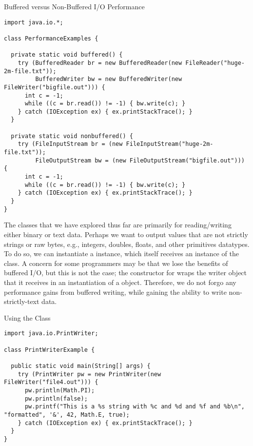 \begin{cl}[]{Buffered versus Non-Buffered I/O Performance}
\begin{lstlisting}[language=MyJava]
import java.io.*;

class PerformanceExamples {
  
  private static void buffered() {
    try (BufferedReader br = new BufferedReader(new FileReader("huge-2m-file.txt"));
         BufferedWriter bw = new BufferedWriter(new FileWriter("bigfile.out"))) {
      int c = -1;
      while ((c = br.read()) != -1) { bw.write(c); }
    } catch (IOException ex) { ex.printStackTrace(); }
  }
  
  private static void nonbuffered() {
    try (FileInputStream br = (new FileInputStream("huge-2m-file.txt"));
         FileOutputStream bw = (new FileOutputStream("bigfile.out"))) {
      int c = -1;
      while ((c = br.read()) != -1) { bw.write(c); }
    } catch (IOException ex) { ex.printStackTrace(); }
  }
}
\end{lstlisting}
\end{cl}  

The classes that we have explored thus far are primarily for reading/writing either binary or text data. Perhaps we want to output values that are not strictly strings or raw bytes, e.g., integers, doubles, floats, and other primitives datatypes. To do so, we can instantiate a  instance, which itself receives an instance of the  class. A concern for some programmers may be that we lose the benefits of buffered I/O, but this is not the case; the constructor for  wraps the writer object that it receives in an instantiation of a  object. Therefore, we do not forgo any performance gains from buffered writing, while gaining the ability to write non-strictly-text data.


\begin{cl}[]{Using the  Class}
\begin{lstlisting}[language=MyJava]
import java.io.PrintWriter;

class PrintWriterExample {
  
  public static void main(String[] args) {
    try (PrintWriter pw = new PrintWriter(new FileWriter("file4.out"))) {
      pw.println(Math.PI);
      pw.println(false);
      pw.printf("This is a %s string with %c and %d and %f and %b\n", "formatted", '&', 42, Math.E, true);
    } catch (IOException ex) { ex.printStackTrace(); }
  }
}
\end{lstlisting}
\end{cl}

